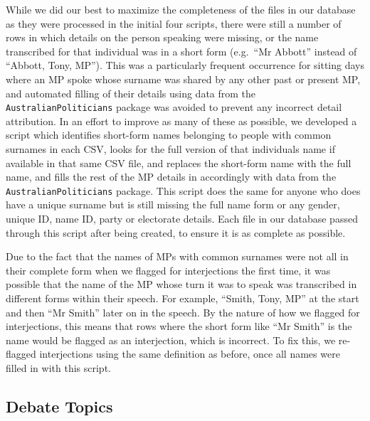 \documentclass[
  letterpaper,
  DIV=11,
  numbers=noendperiod]{scrartcl}
\begin{document}
While we did our best to maximize the completeness of the files in our
database as they were processed in the initial four scripts, there were
still a number of rows in which details on the person speaking were
missing, or the name transcribed for that individual was in a short form
(e.g.~``Mr Abbott'' instead of ``Abbott, Tony, MP''). This was a
particularly frequent occurrence for sitting days where an MP spoke
whose surname was shared by any other past or present MP, and automated
filling of their details using data from the
\texttt{AustralianPoliticians} package was avoided to prevent any
incorrect detail attribution. In an effort to improve as many of these
as possible, we developed a script which identifies short-form names
belonging to people with common surnames in each CSV, looks for the full
version of that individuals name if available in that same CSV file, and
replaces the short-form name with the full name, and fills the rest of
the MP details in accordingly with data from the
\texttt{AustralianPoliticians} package. This script does the same for
anyone who does have a unique surname but is still missing the full name
form or any gender, unique ID, name ID, party or electorate details.
Each file in our database passed through this script after being
created, to ensure it is as complete as possible.

Due to the fact that the names of MPs with common surnames were not all
in their complete form when we flagged for interjections the first time,
it was possible that the name of the MP whose turn it was to speak was
transcribed in different forms within their speech. For example,
``Smith, Tony, MP'' at the start and then ``Mr Smith'' later on in the
speech. By the nature of how we flagged for interjections, this means
that rows where the short form like ``Mr Smith'' is the name would be
flagged as an interjection, which is incorrect. To fix this, we
re-flagged interjections using the same definition as before, once all
names were filled in with this script.

\hypertarget{debate-topics}{%
\subsection{Debate Topics}\label{debate-topics}}
\end{document}
